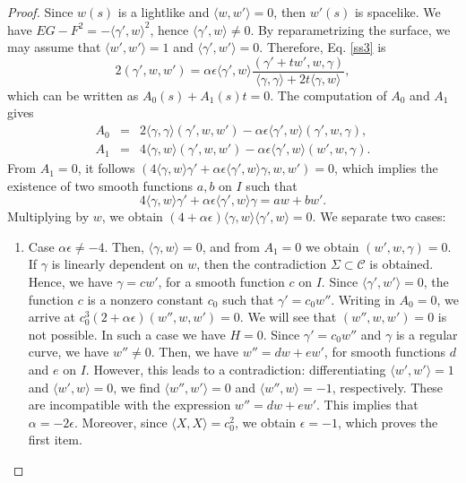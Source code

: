 \documentclass[a4paper,12pt]{amsart}
\theoremstyle{definition}
\begin{document}
\begin{proof}
Since  $w(s)$ is a lightlike and $\langle w,w'\rangle=0$, then   $w'(s)$ is spacelike. We have $EG-F^2=-\langle \gamma',w \rangle^2$, hence $\langle\gamma',w\rangle\not=0$.   By reparametrizing the surface, we may assume that $\langle w',w' \rangle =1$ and $\langle \gamma',w' \rangle =0$. Therefore, Eq. \eqref{ss3} is 
\begin{equation*}
2(\gamma',w,w')=\alpha\epsilon \langle \gamma',w \rangle\frac{ (\gamma'+tw',w,\gamma)}{\langle \gamma,\gamma\rangle+2t\langle \gamma,w\rangle},
\end{equation*}
which can be written as $A_0(s)+A_1(s)t=0$. The computation of $A_0$ and $A_1$ gives
\begin{eqnarray*}
A_0&=&2\langle \gamma,\gamma\rangle(\gamma',w,w') -\alpha\epsilon \langle \gamma',w \rangle (\gamma',w,\gamma),\\
A_1&=&4\langle \gamma,w\rangle(\gamma',w,w')-\alpha \epsilon\langle \gamma',w \rangle(w',w,\gamma).
\end{eqnarray*}
From $A_1=0$, it follows $(4\langle \gamma,w\rangle\gamma'+\alpha\epsilon \langle \gamma',w \rangle\gamma,w,w')=0$, which implies the existence of two smooth functions $a,b$ on $I$ such that
\begin{equation}
4\langle \gamma,w\rangle\gamma'+\alpha \epsilon\langle \gamma',w \rangle\gamma=aw+bw'. \label{l-1}
\end{equation}
Multiplying by $w$, we obtain $(4+\alpha\epsilon)\langle \gamma,w\rangle\langle \gamma',w \rangle=0$. 
We separate two cases:

\begin{enumerate}
\item Case $\alpha\epsilon \neq-4$. Then, $\langle \gamma,w\rangle=0$, and from $A_1=0$ we obtain $(w',w,\gamma)=0$. If $\gamma$ is linearly dependent on $w$, then the contradiction $\Sigma \subset \mathcal{C}$ is obtained. Hence, we have $\gamma=cw'$, for a smooth function $c$ on $I$. Since $\langle \gamma',w' \rangle =0$, the function $c$ is a nonzero constant $c_0$ such that $\gamma'=c_0w''$. Writing in $A_0=0$, we arrive at $c_0^3(2+\alpha\epsilon)(w'',w,w')=0$. 
We will see that $(w'',w,w')=0$ is not possible. In such a case we have $H=0$. Since $\gamma'=c_0w''$ and $\gamma$ is a regular curve, we have $w''\neq 0$. Then, we have $w''=dw+ew'$, for smooth functions $d$ and $e$ on $I$.  However, this leads to a contradiction: differentiating $\langle w',w' \rangle=1$ and $\langle w',w \rangle=0$, we find $\langle w'',w' \rangle = 0$ and $\langle w'',w  \rangle = -1$, respectively. These are incompatible with the expression $w''=dw+ew'$. This implies that  $\alpha=-2\epsilon$.  Moreover, since $\langle X,X\rangle=c_0^2$, we obtain $\epsilon =-1$, which proves the first item.


\end{enumerate}
\end{proof}
\end{document}
